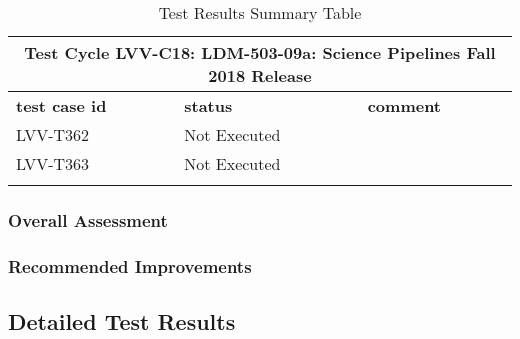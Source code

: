 \documentclass[DM,lsstdraft,STR,toc]{lsstdoc}
\begin{document}
\begin{longtable} {p{}p{}p{}}
\toprule
\multicolumn{3}{c}{ Test Cycle {\bf LVV-C18: LDM-503-09a: Science Pipelines Fall 2018 Release }} \\\hline
{\bf \footnotesize test case id} & {\bf \footnotesize status} & {\bf \footnotesize comment} \\\toprule
LVV-T362 & Not Executed &  \\\hline
LVV-T363 & Not Executed &  \\\hline
\caption{Test Results Summary Table}
\label{table:summary}
\end{longtable}

\subsubsection{Overall Assessment}
\label{sect:overallassessment}


\subsubsection{Recommended Improvements}
\label{sect:recommendations}

\subsection{Detailed Test Results}
\label{sect:detailedtestresults}
\end{document}
